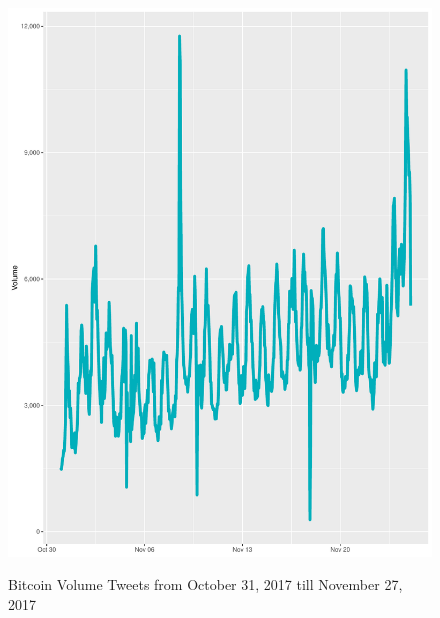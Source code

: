 \documentclass[conference]{IEEEtran}
\begin{document}
\begin{minipage}{\linewidth}
\begin{figure}[H]
\centering
\caption{Bitcoin Volume Tweets from October 31, 2017 till November 27, 2017} 
\includegraphics[scale=0.3]{Graphs/BitcoinVolumeChart.pdf}
\label{Bitcoin Volume Tweets} 
\end{figure}
\end{minipage}
\end{document}
